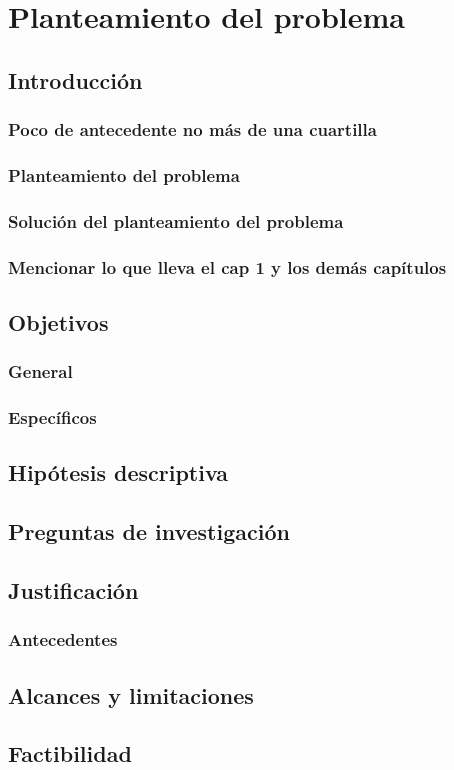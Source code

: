 \chapter{Planteamiento del problema}
\section{Introducción}
\subsection{Poco de antecedente no más de una cuartilla}
\subsection{Planteamiento del problema}
\subsection{Solución del planteamiento del problema}
\subsection{Mencionar lo que lleva el cap 1 y los demás capítulos}

\section{Objetivos}
\subsection{General}
\subsection{Específicos}

\section{Hipótesis descriptiva}

\section{Preguntas de investigación}

\section{Justificación}
\subsection{Antecedentes}

\section{Alcances y limitaciones}

\section{Factibilidad}